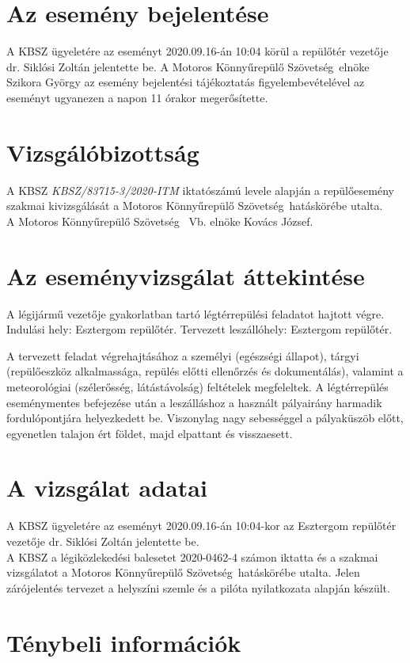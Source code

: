 \documentclass[a4paper,10pt]{article}
\newcommand{\mksz}{Motoros Könnyűrepülő Szövetség\ }
\begin{document}
\section*{Az esemény bejelentése}
A KBSZ ügyeletére az eseményt 2020.09.16-án 10:04 körül a repülőtér
vezetője dr. Siklósi Zoltán jelentette be. A \mksz  elnöke Szikora György
az esemény bejelentési tájékoztatás figyelembevételével az eseményt ugyanezen a napon 11 órakor megerősítette.

\section*{Vizsgálóbizottság}
A KBSZ \textit{KBSZ/83715-3/2020-ITM} iktatószámú levele alapján a 
repülőesemény szakmai kivizsgálását a \mksz hatáskörébe utalta.\\A \mksz
Vb. elnöke Kovács József.

\section*{Az eseményvizsgálat áttekintése}
A légijármű vezetője gyakorlatban tartó légtérrepülési feladatot hajtott
végre.
Indulási hely: Esztergom repülőtér. Tervezett leszállóhely: Esztergom
repülőtér.

A tervezett feladat végrehajtásához a személyi (egészségi állapot), tárgyi 
(repülőeszköz alkalmassága, repülés előtti ellenőrzés és dokumentálás), 
valamint a meteorológiai (szélerősség, látástávolság) feltételek
megfeleltek. 
A légtérrepülés eseménymentes befejezése után a leszálláshoz a használt 
pályairány harmadik fordulópontjára helyezkedett be. Viszonylag nagy 
sebességgel a pályaküszöb előtt, egyenetlen talajon ért földet, majd
elpattant és visszaesett.

\section*{A vizsgálat adatai}
A KBSZ ügyeletére az eseményt 2020.09.16-án 10:04-kor az Esztergom 
repülőtér vezetője dr. Siklósi Zoltán jelentette be.
\\

A KBSZ a légiközlekedési balesetet 2020-0462-4 számon iktatta és a szakmai 
vizsgálatot a \mksz hatáskörébe utalta. Jelen zárójelentés tervezet a helyszíni 
szemle és a pilóta nyilatkozata alapján készült.

\section{Ténybeli információk}
\end{document}
